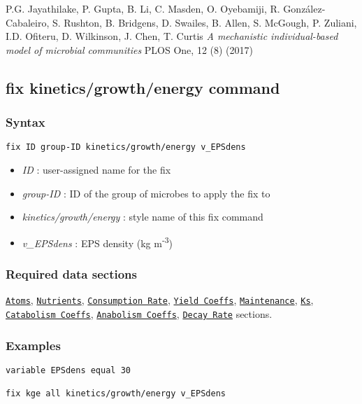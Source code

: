 \documentclass[11pt,a4paper,openright]{article}
\begin{document}
P.G. Jayathilake, P. Gupta, B. Li, C. Masden, O. Oyebamiji, R. González-Cabaleiro, S. Rushton, B. Bridgens, D. Swailes, B. Allen, S. McGough, P. Zuliani, I.D. Ofiteru, D. Wilkinson, J. Chen, T. Curtis
{\it A mechanistic individual-based model of microbial communities}
PLOS One, 12 (8) (2017)

\newpage
\subsection{fix kinetics/growth/energy command}
\label{fkineticsenergy}

\subsubsection*{Syntax}

\begin{Verbatim}[frame=single]
fix ID group-ID kinetics/growth/energy v_EPSdens 
\end{Verbatim}

\begin{itemize} [nosep]
\item
	{\it ID }: user-assigned name for the fix
\item
	{\it group-ID }: ID of the group of microbes to apply the fix to
\item
	{\it kinetics/growth/energy }: style name of this fix command
\item
	{\it v\_EPSdens  }: EPS density (kg m\textsuperscript{-3})
	 	
\end{itemize}

\subsubsection*{Required data sections}
\hyperref[satom]{\tt Atoms}, 
\hyperref[snutrients]{\tt Nutrients}, 
\hyperref[sconsum]{\tt Consumption Rate},
\hyperref[syield]{\tt Yield Coeffs},
\hyperref[smaintain]{\tt Maintenance},
\hyperref[sks]{\tt Ks},
\hyperref[scata]{\tt Catabolism Coeffs},
\hyperref[sana]{\tt Anabolism Coeffs},
\hyperref[sdecay]{\tt Decay Rate}  sections. \\

\subsubsection*{Examples}

\begin{Verbatim}[frame=single]
variable EPSdens equal 30

fix kge all kinetics/growth/energy v_EPSdens
\end{Verbatim}
\end{document}
